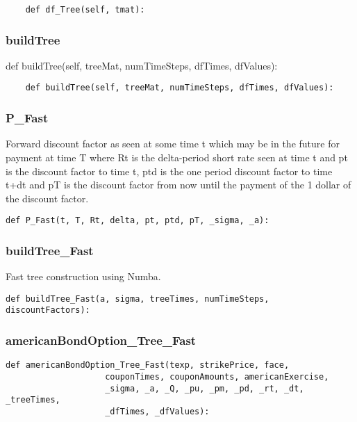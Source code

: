 \documentclass[twoside,11pt]{book}
\begin{document}
\begin{lstlisting}
    def df_Tree(self, tmat):
\end{lstlisting}

\subsubsection*{{\bf buildTree}}
def buildTree(self, treeMat, numTimeSteps, dfTimes, dfValues): 

\begin{lstlisting}
    def buildTree(self, treeMat, numTimeSteps, dfTimes, dfValues):
\end{lstlisting}

\subsubsection*{{\bf P\_Fast}}
Forward discount factor as seen at some time t which may be in the future for payment at time T where Rt is the delta-period short rate seen at time t and pt is the discount factor to time t, ptd is the one period discount factor to time t+dt and pT is the discount factor from now until the payment of the 1 dollar of the discount factor.  

\begin{lstlisting}
def P_Fast(t, T, Rt, delta, pt, ptd, pT, _sigma, _a):
\end{lstlisting}

\subsubsection*{{\bf buildTree\_Fast}}
Fast tree construction using Numba.  

\begin{lstlisting}
def buildTree_Fast(a, sigma, treeTimes, numTimeSteps, discountFactors):
\end{lstlisting}

\subsubsection*{{\bf americanBondOption\_Tree\_Fast}}


\begin{lstlisting}
def americanBondOption_Tree_Fast(texp, strikePrice, face,
                    couponTimes, couponAmounts, americanExercise,
                    _sigma, _a, _Q, _pu, _pm, _pd, _rt, _dt, _treeTimes,
                    _dfTimes, _dfValues):
\end{lstlisting}
\end{document}
